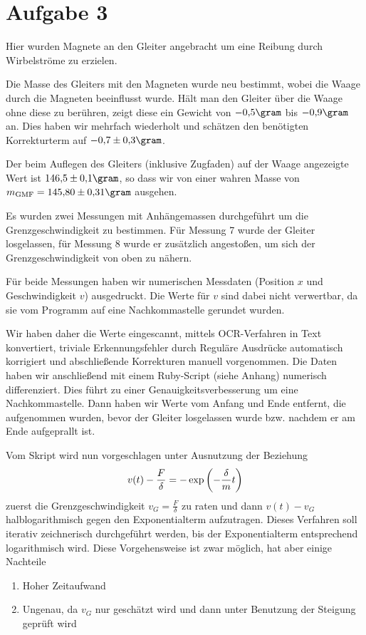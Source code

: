 \documentclass[a4paper,german,12pt,smallheadings]{scrartcl}
\begin{document}
\section*{Aufgabe 3}


Hier wurden Magnete an den Gleiter angebracht um eine Reibung durch
Wirbelströme zu erzielen.

Die Masse des Gleiters mit den Magneten wurde neu bestimmt, wobei die Waage
durch die Magneten beeinflusst wurde. Hält man den Gleiter über die Waage ohne
diese zu berühren, zeigt diese ein Gewicht von $-0{,}5 \gram$ bis $-0{,}9
\gram$  an. Dies haben wir mehrfach wiederholt und schätzen den benötigten
Korrekturterm auf $-0{,}7 \pm 0{,}3 \gram$.

Der beim Auflegen des Gleiters (inklusive Zugfaden) auf der Waage angezeigte
Wert ist $146{,}5\pm0{,}1 \gram$, so dass wir von einer wahren Masse von
$m_\text{GMF} = 145{,}80\pm0{,}31 \gram$ ausgehen.


Es wurden zwei Messungen mit Anhängemassen durchgeführt um die
Grenzgeschwindigkeit zu bestimmen. Für Messung 7 wurde der Gleiter losgelassen,
für Messung 8 wurde er zusätzlich angestoßen, um sich der Grenzgeschwindigkeit
von oben zu nähern.

Für beide Messungen haben wir numerischen Messdaten (Position $x$ und
Geschwindigkeit $v$) ausgedruckt. Die Werte für $v$ sind dabei nicht
verwertbar, da sie vom Programm auf eine Nachkommastelle gerundet wurden.

Wir haben daher die Werte eingescannt, mittels OCR-Verfahren in Text konvertiert,
triviale Erkennungsfehler durch Reguläre Ausdrücke automatisch korrigiert und
abschließende Korrekturen manuell vorgenommen. Die Daten haben wir anschließend
mit einem Ruby-Script (siehe Anhang) numerisch differenziert. Dies führt zu
einer Genauigkeitsverbesserung um eine Nachkommastelle. Dann haben wir Werte
vom Anfang und Ende entfernt, die aufgenommen wurden, bevor der Gleiter
losgelassen wurde bzw. nachdem er am Ende aufgeprallt ist.

Vom Skript wird nun vorgeschlagen unter Ausnutzung der Beziehung
\begin{equation}
  v(t) - \frac{F}{\delta} = -\exp \del{- \frac{\delta}{m} t}
\end{equation}
zuerst die Grenzgeschwindigkeit $v_G = \frac{F}{\delta}$ zu raten und dann
$v(t) - v_G$ halblogarithmisch gegen den Exponentialterm aufzutragen. Dieses
Verfahren soll iterativ zeichnerisch durchgeführt werden, bis der
Exponentialterm entsprechend logarithmisch wird. Diese Vorgehensweise ist zwar
möglich, hat aber einige Nachteile
\begin{enumerate}[1.]
  \item Hoher Zeitaufwand
  \item Ungenau, da $v_G$ nur geschätzt wird und dann unter Benutzung der Steigung geprüft wird
\end{enumerate}
\end{document}
